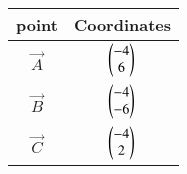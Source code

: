 \begin{tabular}{ |c| c|}
    \hline
    \textbf{point}  &  \textbf{Coordinates}\\
    \hline
    $\vec{A}$ & $\begin{pmatrix}-4\\ 6\end{pmatrix}$ \\
    \hline
    $\vec{B}$ & $\begin{pmatrix}-4\\ -6\end{pmatrix}$\\
    \hline
    $\vec{C}$ & $\begin{pmatrix}-4\\ 2\end{pmatrix}$\\
    \hline
\end{tabular}    

